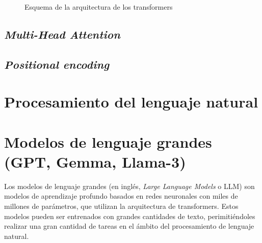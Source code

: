 \documentclass[11pt,spanish,listoffigures,listoftables]{tfgetsinf}
\begin{document}
\begin{figure}[h]
    \caption{Esquema de la arquitectura de los transformers}
    \label{fig:transformers}
\end{figure}

\subsection{\textit{Multi-Head Attention}}
\subsection{\textit{Positional encoding}}




\section{Procesamiento del lenguaje natural}

\section{Modelos de lenguaje grandes (GPT, Gemma, Llama-3)}


Los modelos de lenguaje grandes (en inglés, \textit{Large Language Models} o LLM) son modelos de aprendizaje profundo basados en redes neuronales con miles de millones de parámetros, que utilizan la arquitectura de transformers. Estos modelos pueden ser entrenados con grandes cantidades de texto, perimitiéndoles realizar una gran cantidad de tareas en el ámbito del procesamiento de lenguaje natural.
\end{document}
